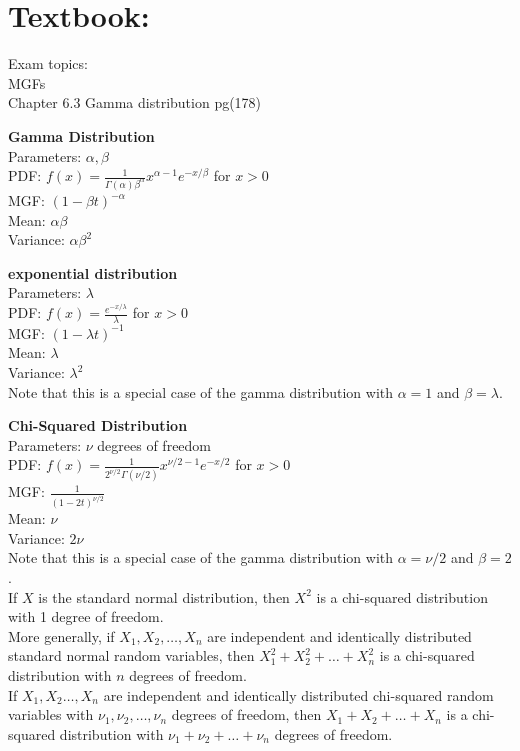 \documentclass[answers,12pt,addpoints]{exam}
\begin{document}
\section{Textbook:}
Exam topics: \\
MGFs\\
Chapter 6.3 Gamma distribution pg(178) \\
\begin{definition}
    \textbf{Gamma Distribution}\\
    Parameters: $\alpha, \beta$\\
    PDF: $f(x) = \frac{1}{\Gamma(\alpha)\beta^\alpha}x^{\alpha-1}e^{-x/\beta}$ for $x > 0$\\
    MGF: $(1-\beta t)^{-\alpha}$\\
    Mean: $\alpha\beta$\\
    Variance: $\alpha\beta^2$
\end{definition}
\begin{definition}
    \textbf{exponential distribution}\\
    Parameters: $\lambda$\\
    PDF: $f(x) = \frac{e^{-x/\lambda}}{\lambda}$ for $x > 0$\\
    MGF: $(1-\lambda t)^{-1}$\\
    Mean: $\lambda$\\
    Variance: $\lambda^2$\\
    Note that this is a special case of the gamma distribution with $\alpha = 1$ and $\beta = \lambda$.
\end{definition}
\begin{definition}
    \textbf{Chi-Squared Distribution}\\
    Parameters: $\nu$ degrees of freedom\\
    PDF: $f(x) = \frac{1}{2^{\nu/2}\Gamma(\nu/2)}x^{\nu/2-1}e^{-x/2}$ for $x > 0$\\
    MGF: $\frac{1}{(1-2t)^{\nu/2}}$\\
    Mean: $\nu$\\
    Variance: $2\nu$\\
    Note that this is a special case of the gamma distribution with $\alpha = \nu/2$ and $\beta = 2$.\\
    If $X$ is the standard normal distribution, then $X^2$ is a chi-squared distribution with 1 degree of freedom.\\
    More generally, if $X_1, X_2, \ldots, X_n$ are independent and identically distributed standard normal random variables, then $X_1^2 + X_2^2 + \ldots + X_n^2$ is a chi-squared distribution with $n$ degrees of freedom.\\
    If $X_1, X_2 \ldots, X_n$ are independent and identically distributed chi-squared random variables with $\nu_1, \nu_2, \ldots, \nu_n$ degrees of freedom, then $X_1 + X_2 + \ldots + X_n$ is a chi-squared distribution with $\nu_1 + \nu_2 + \ldots + \nu_n$ degrees of freedom.
\end{definition}
\end{document}
